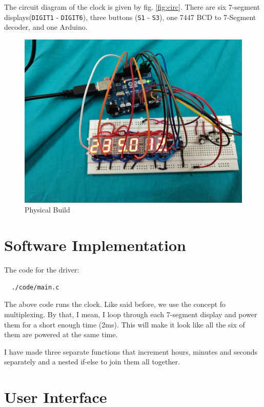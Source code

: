 \documentclass[journal]{IEEEtran}
\begin{document}
The circuit diagram of the clock is given by fig. \ref{fig:circ}. There are six 7-segment displays(\texttt{DIGIT1} - \texttt{DIGIT6}), three buttons (\texttt{S1} - \texttt{S3}), one 7447 BCD to 7-Segment decoder, and one Arduino.

\begin{figure}
  \centering
  \includegraphics[width=1\linewidth]{figs/clkP.jpg}
  \caption{Physical Build}
\end{figure}

\section{Software Implementation}\label{section:sft}

% 
The code for the driver:
\begin{lstlisting}
  ./code/main.c
\end{lstlisting}

The above code runs the clock. Like said before, we use the concept fo multiplexing. By that, I mean, I loop through each 7-segment display and power them for a short enough time (2ms). This will make it look like all the six of them are powered at the same time.

I have made three separate functions that increment hours, minutes and seconds separately and a nested if-else to join them all together. 

\section{User Interface}
\end{document}
